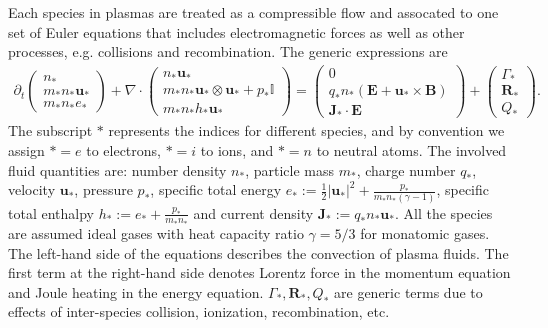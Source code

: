 \documentclass{article}
\begin{document}
Each species in plasmas are treated as a compressible flow and assocated to one set of Euler equations that includes electromagnetic forces as well as other processes, e.g. collisions and recombination. The generic expressions are
\begin{align} \label{equ:euler_}
    \partial_t
    \begin{pmatrix}
    n_* \\
    m_*n_* \mathbf{u}_* \\
    m_*n_* e_*
    \end{pmatrix}
    + \nabla \cdot
    \begin{pmatrix}
    n_* \mathbf{u}_* \\
    m_*n_* \mathbf{u}_* \otimes \mathbf{u}_* + p_*\mathbb{I} \\
    m_*n_* h_* \mathbf{u}_*
    \end{pmatrix}
    =
    \begin{pmatrix}
    0 \\
    q_*n_*(\mathbf{E} + \mathbf{u}_* \times \mathbf{B}) \\
    \mathbf{J}_* \cdot \mathbf{E}
    \end{pmatrix}
    +
    \begin{pmatrix}
    \Gamma_* \\
    \mathbf{R}_* \\
    Q_*
    \end{pmatrix}.
\end{align}
The subscript $*$ represents the indices for different species, and by convention we assign $* = e$ to electrons, $* = i$ to ions, and $* = n$ to neutral atoms. The involved fluid quantities are: number density $n_*$, particle mass $m_*$,  charge number $q_*$, velocity $\mathbf{u}_*$, pressure $p_*$, specific total energy $e_* := \frac{1}{2}|\mathbf{u}_*|^2 + \frac{p_*}{m_*n_*(\gamma - 1)}$, specific total enthalpy $h_* := e_* + \frac{p_*}{m_*n_*}$ and current density $\mathbf{J}_* := q_*n_*\mathbf{u}_*$. All the species are assumed ideal gases with heat capacity ratio $\gamma=5/3$ for monatomic gases. The left-hand side of the equations describes the convection of plasma fluids. The first term at the right-hand side denotes Lorentz force in the momentum equation and Joule heating in the energy equation. $\Gamma_*, \mathbf{R}_*, Q_*$ are generic terms due to effects of inter-species collision, ionization, recombination, etc. 
\end{document}
